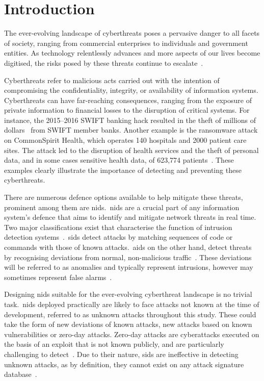 \chapter{Introduction}%
\label{chp:introduction}


The ever-evolving landscape of cyberthreats poses a pervasive danger to all
facets of society, ranging from commercial enterprises to individuals and
government entities. As technology relentlessly advances and more aspects of
our lives become digitised, the risks posed by these threats continue to
escalate~\cite{ENISA}.

Cyberthreats refer to malicious acts carried out with the intention of
compromising the confidentiality, integrity, or availability of information
systems. Cyberthreats can have far-reaching consequences, ranging from the
exposure of private information to financial losses to the disruption of
critical systems. For instance, the 2015--2016 SWIFT banking hack resulted in
the theft of millions of dollars~\cite{swift_attack1, swift_attack2} from SWIFT
member banks. Another example is the ransomware attack on CommonSpirit Health,
which operates 140 hospitals and 2000 patient care sites. The attack led to the
disruption of health services and the theft of personal data, and in some cases
sensitive health data, of 623,774 patients~\cite{commonspirit1, commonspirit2,
    commonspirit3}. These examples clearly illustrate the importance of detecting
and preventing these cyberthreats.

There are numerous defence options available to help mitigate these threats,
prominent among them are \gls{nids}.\ \gls{nids} are a crucial part of any
information system's defence that aims to identify and mitigate network threats
in real time. Two major classifications exist that characterise the function of
intrusion detection systems~\cite{survey1}.\ \gls{sids} detect attacks by
matching sequences of code or commands with those of known attacks.\ \gls{aids}
on the other hand, detect threats by recognising deviations from normal,
non-malicious traffic~\cite{survey1}. These deviations will be referred to as
anomalies and typically represent intrusions, however may sometimes represent
false alarms~\cite{anomaly}.

Designing \gls{nids} suitable for the ever-evolving cyberthreat landscape is no
trivial task.\ \gls{nids} deployed practically are likely to face attacks not
known at the time of development, referred to as unknown attacks throughout
this study. These could take the form of new deviations of known attacks, new
attacks based on known vulnerabilities or zero-day attacks. Zero-day attacks
are cyberattacks executed on the basis of an exploit that is not known
publicly, and are particularly challenging to detect~\cite{zero-day-def}. Due
to their nature, \gls{sids} are ineffective in detecting unknown attacks, as by
definition, they cannot exist on any attack signature database~\cite{survey1}.

